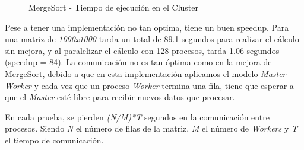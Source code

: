 			\begin{figure}[!h]
				\centering
				\caption{MergeSort - Tiempo de ejecución en el Cluster}
			\end{figure}
			
			
			Pese a tener una implementación no tan optima, tiene un buen speedup. Para una matriz de \textit{1000x1000} tarda un total de 89.1 segundos para realizar el cálculo sin mejora, y al paralelizar el cálculo con 128 procesos, tarda 1.06 segundos (speedup = 84). La comunicación no es tan óptima como en la mejora de MergeSort, debido a que en esta implementación aplicamos el modelo \textit{Master-Worker} y cada vez que un proceso \textit{Worker} termina una fila, tiene que esperar a que el \textit{Master} esté libre para recibir nuevos datos que procesar. 
			
			En cada prueba, se pierden \textit{(N/M)*T} segundos en la comunicación entre procesos. Siendo \textit{N} el número de filas de la matriz, \textit{M} el número de \textit{Workers} y \textit{T} el tiempo de comunicación.
			
			
		

\newpage


